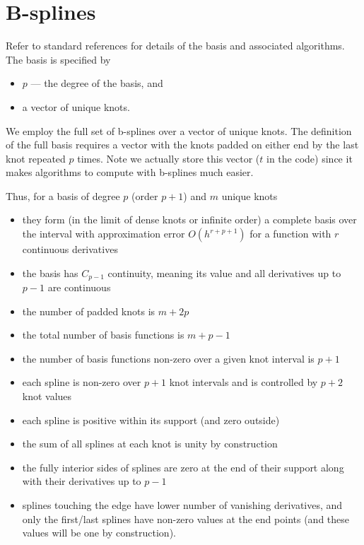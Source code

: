 \documentclass[12pt]{article}
\begin{document}
\section{B-splines}

Refer to standard references for details of the basis and associated algorithms.  The basis is specified by 
\begin{itemize}
\item $p$ --- the degree of the basis, and
\item a vector of unique knots.
\end{itemize}
We employ the full set of b-splines over a vector of unique knots.  The definition of the full basis requires a vector with the knots padded on either end by the last knot repeated $p$ times.  Note we actually store this vector ($t$ in the code) since it makes algorithms to compute with b-splines much easier. 

Thus, for a basis of degree $p$ (order $p+1$) and $m$ unique knots 
\begin{itemize}
\item they form (in the limit of dense knots or infinite order) a complete basis over the interval with approximation error $O\left(h^{r+p+1}\right)$ for a function with $r$ continuous derivatives 
\item the basis has $C_{p-1}$ continuity, meaning its value and all derivatives up to $p-1$ are continuous
\item the number of padded knots is $m + 2p$
\item the total number of basis functions is $m + p - 1$ 
\item the number of basis functions non-zero over a given knot interval is $p + 1$
\item each spline is non-zero over $p+1$ knot intervals and is controlled by $p+2$ knot values
\item each spline is positive within its support (and zero outside)
\item the sum of all splines at each knot is unity by construction
\item the fully interior sides of splines are zero at the end of their support along with their derivatives up to $p-1$
\item splines touching the edge have lower number of vanishing derivatives, and only the first/last splines have non-zero values at the end points (and these values will be one by construction).
\end{itemize}
\end{document}
